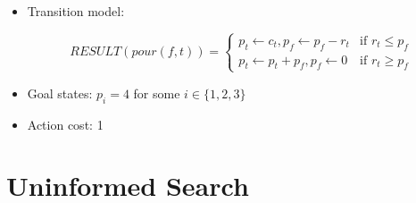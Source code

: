 \begin{questions}
\begin{solution}[1in]
\begin{itemize}
\item Transition model:

$$
RESULT(pour(f, t)) =
\begin{cases}
p_t \gets c_t, p_f \gets p_f -  r_t &\text{if } r_t \le p_f \\
p_t \gets p_t + p_f, p_f \gets 0 &\text{if } r_t \ge p_f
\end{cases}
$$

\item Goal states: $p_i = 4$ for some $i \in \{1, 2, 3\}$
\item Action cost: 1
\end{itemize}
\end{solution}

\end{questions}

\newpage

\section{Uninformed Search}

